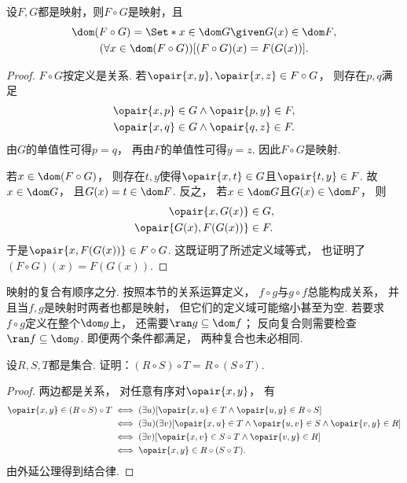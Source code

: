 \begin{theorem}\label{theorem:集合论.映射的复合也是映射}
    设\(F,G\)都是映射，则\(F \circ G\)是映射，且
    \begin{gather*}
        \dom(F \circ G)
        = \Set*{ x \in \dom G \given G(x) \in \dom F }, \\
        (\forall x \in \dom(F \circ G))
        [(F \circ G)(x) = F(G(x))].
    \end{gather*}
    \begin{proof}
        \(F\circ G\)按定义是关系.
        若\(\opair{x,y},\opair{x,z}\in F\circ G\)，
        则存在\(p,q\)满足
        \begin{align*}
            \opair{x,p}\in G &\land\opair{p,y}\in F, \\
            \opair{x,q}\in G &\land\opair{q,z}\in F.
        \end{align*}
        由\(G\)的单值性可得\(p=q\)，
        再由\(F\)的单值性可得\(y=z\).
        因此\(F\circ G\)是映射.

        若\(x\in\dom(F\circ G)\)，
        则存在\(t,y\)使得\(\opair{x,t}\in G\)且\(\opair{t,y}\in F\).
        故\(x\in\dom G\)，
        且\(G(x)=t\in\dom F\).
        反之，
        若\(x\in\dom G\)且\(G(x)\in\dom F\)，
        则
        \begin{align*}
            \opair{x,G(x)} &\in G, \\
            \opair{G(x),F(G(x))} &\in F.
        \end{align*}
        于是\(\opair{x,F(G(x))}\in F\circ G\).
        这既证明了所述定义域等式，
        也证明了\((F\circ G)(x)=F(G(x))\).
    \end{proof}
\end{theorem}

映射的复合有顺序之分.
按照本节的关系运算定义，
\(f\circ g\)与\(g\circ f\)总能构成关系，
并且当\(f,g\)是映射时两者也都是映射，
但它们的定义域可能缩小甚至为空.
若要求\(f\circ g\)定义在整个\(\dom g\)上，
还需要\(\ran g\subseteq\dom f\)；
反向复合则需要检查\(\ran f\subseteq\dom g\).
即便两个条件都满足，
两种复合也未必相同.

\begin{example}\label{example:映射.映射的复合适合结合律}
    设\(R,S,T\)都是集合.
    证明：\((R \circ S) \circ T = R \circ (S \circ T)\).
    \begin{proof}
        两边都是关系，
        对任意有序对\(\opair{x,y}\)，
        有
        \begin{align*}
            \opair{x,y}\in(R\circ S)\circ T
            &\iff(\exists u)[\opair{x,u}\in T\land\opair{u,y}\in R\circ S] \\
            &\iff(\exists u)(\exists v)
            [\opair{x,u}\in T\land\opair{u,v}\in S\land\opair{v,y}\in R] \\
            &\iff(\exists v)[\opair{x,v}\in S\circ T\land\opair{v,y}\in R] \\
            &\iff\opair{x,y}\in R\circ(S\circ T).
        \end{align*}
        由外延公理得到结合律.
    \end{proof}
\end{example}

